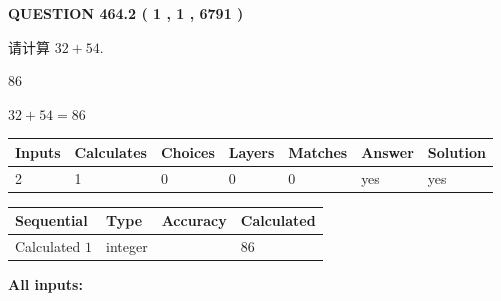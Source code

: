 \documentclass{ctexart}
\begin{document}
   
  
\vspace{0.2in}
  
{\textbf{\Large{QUESTION
464.2 
 ( 1 , 1 , 6791 )
}}}
  
  
 
请计算 $ %
32 +  %
54 $.
 
 
 
\noindent{}
 
 

86
 
 
\noindent{}
 
 

 
 
 
\noindent{}
 
 

$ %
32 +  %
54=   %
86$
 
 
\noindent{}
 
 

 
   
   
   
   
\noindent\begin{tabular}{|l|l|l|l|l|l|l|}
 \hline
Inputs & Calculates & Choices & Layers & Matches & Answer & Solution \\ \hline
 2  & 
 1  & 
 0
  & 
 0  & 
 0  & 
  yes & 
  yes 
  \\ \hline
 \end{tabular}
   
   
   
   
\noindent{}
   
   
  
  
\noindent\begin{tabular}{|l|l|l|l|}
\hline
 Sequential & Type & Accuracy & Calculated \\ 
\hline
 
 
  Calculated $  1 $ & integer &  & 
  $ 86 $ 
 \\  \hline  
 \end{tabular}
   
   
   
   
\noindent\vspace{0.1in}\hspace{-0.08in} {\textbf{\Large{All inputs: }}}
   
\end{document}
